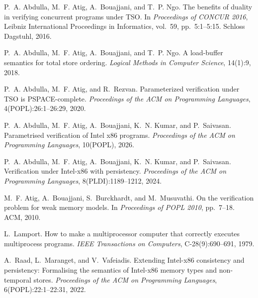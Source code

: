 
P.~A. Abdulla, M.~F. Atig, A.~Bouajjani, and T.~P. Ngo.
\newblock The benefits of duality in verifying concurrent programs under {TSO}.
\newblock In \emph{Proceedings of CONCUR 2016}, Leibniz International
  Proceedings in Informatics, vol.~59, pp.~5:1--5:15.
  Schloss Dagstuhl, 2016.

P.~A. Abdulla, M.~F. Atig, A.~Bouajjani, and T.~P. Ngo.
\newblock A load-buffer semantics for total store ordering.
\newblock \emph{Logical Methods in Computer Science}, 14(1):9, 2018.

P.~A. Abdulla, M.~F. Atig, and R.~Rezvan.
\newblock Parameterized verification under {TSO} is {PSPACE}-complete.
\newblock \emph{Proceedings of the ACM on Programming Languages},
  4(POPL):26:1--26:29, 2020.

P.~A. Abdulla, M.~F. Atig, A.~Bouajjani, K.~N. Kumar, and P.~Saivasan.
\newblock Parametrised verification of {Intel} x86 programs.
\newblock \emph{Proceedings of the ACM on Programming Languages},
  10(POPL), 2026.

P.~A. Abdulla, M.~F. Atig, A.~Bouajjani, K.~N. Kumar, and P.~Saivasan.
\newblock Verification under {Intel}-x86 with persistency.
\newblock \emph{Proceedings of the ACM on Programming Languages},
  8(PLDI):1189--1212, 2024.

M.~F. Atig, A.~Bouajjani, S.~Burckhardt, and M.~Musuvathi.
\newblock On the verification problem for weak memory models.
\newblock In \emph{Proceedings of POPL 2010}, pp.~7--18. ACM, 2010.

L.~Lamport.
\newblock How to make a multiprocessor computer that correctly executes
  multiprocess programs.
\newblock \emph{IEEE Transactions on Computers}, C-28(9):690--691, 1979.

A.~Raad, L.~Maranget, and V.~Vafeiadis.
\newblock Extending {Intel}-x86 consistency and persistency: Formalising the
  semantics of {Intel}-x86 memory types and non-temporal stores.
\newblock \emph{Proceedings of the ACM on Programming Languages},
  6(POPL):22:1--22:31, 2022.

